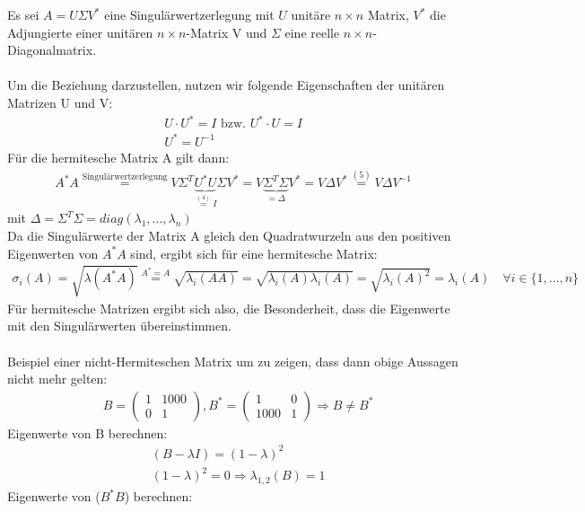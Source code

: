 Es sei $A=U\Sigma V^*$ eine Singulärwertzerlegung mit $U$ unitäre $n\times n$ Matrix, $V^*$ die Adjungierte einer unitären $n\times n$-Matrix V und $\Sigma$ eine reelle $n\times n$-Diagonalmatrix.\\\\
Um die Beziehung darzustellen, nutzen wir folgende Eigenschaften der unitären Matrizen U und V:
\begin{align}
U\cdot U^* =I \text{ bzw. } U^* \cdot U=I\\
U^*=U^{-1}
\end{align}
Für die hermitesche Matrix A gilt dann:
\begin{align}
A^*A\overset{\text{Singulärwertzerlegung}}{=} V\Sigma^T\underbrace{U^*U}_{\overset{(4)}{=}I}\Sigma
V^* = V\underbrace{\Sigma^T\Sigma}_{=\Delta}V^*=V\Delta V^*\overset{(5)}{=}V\Delta V^{-1}
\end{align}
mit $\Delta=\Sigma^T \Sigma=diag(\lambda_1,\ldots,\lambda_n)$\\
\newline
Da die Singulärwerte der Matrix A gleich den Quadratwurzeln aus den positiven Eigenwerten von $A^*A$ sind, ergibt sich für eine hermitesche Matrix:
\begin{align*}
	\sigma_i(A)=\sqrt{\lambda(A^*A)} \overset{A^*=A}{=} \sqrt{\lambda_i(AA)}=\sqrt{\lambda_i(A)\lambda_i(A)}=\sqrt{\lambda_i(A)^2}=\lambda_i(A) \quad \forall i\in\{1,\ldots,n\}
\end{align*}
Für hermitesche Matrizen ergibt sich also, die Besonderheit, dass die Eigenwerte mit den Singulärwerten übereinstimmen.\\\\
\newline
Beispiel einer nicht-Hermiteschen Matrix um zu zeigen, dass dann obige Aussagen nicht mehr gelten:
\begin{align*}
&B=
\begin{pmatrix}
	1 & 1000\\
	0 & 1
\end{pmatrix}, 
B^*=
\begin{pmatrix}
1 & 0\\
1000 & 1
\end{pmatrix}
\Rightarrow B\neq B^*\end{align*}
Eigenwerte von B berechnen:
\begin{align*}
&(B-\lambda I)=(1-\lambda)^2\\
&(1-\lambda)^2=0 \Rightarrow \lambda_{1,2}(B)=1
\end{align*}
Eigenwerte von ($B^*B$) berechnen:
